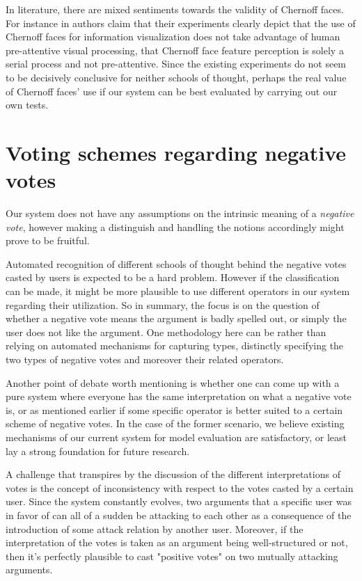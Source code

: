\documentclass{article}
\begin{document}
In literature, there are mixed sentiments towards the validity of Chernoff faces. For instance in \cite{Morris00} authors claim that their experiments clearly depict that the use of Chernoff faces for information visualization does not take advantage of human pre-attentive visual processing, that Chernoff face feature perception is solely a serial process and not pre-attentive. Since the existing experiments do not seem to be decisively conclusive for neither schools of thought, perhaps the real value of Chernoff faces' use if our system can be best evaluated by carrying out our own tests.


\section{Voting schemes regarding negative votes}
Our system does not have any assumptions on the intrinsic meaning of a \textit{negative vote}, however making a distinguish and handling the notions accordingly might prove to be fruitful.

Automated recognition of different schools of thought behind the negative votes casted by users is expected to be a hard problem. However if the classification can be made, it might be more plausible to use different operators in our system regarding their utilization. So in summary, the focus is on the question of whether a negative vote means the argument is badly spelled out, or simply the user does not like the argument. One methodology here can be rather than relying on automated mechanisms for capturing types, distinctly specifying the two types of negative votes and moreover their related operators. 

Another point of debate worth mentioning is whether one can come up with a pure system where everyone has the same interpretation on what a negative vote is, or as mentioned earlier if some specific operator is better suited to a certain scheme of negative votes. In the case of the former scenario, we believe existing mechanisms of our current system for model evaluation are satisfactory, or least lay a strong foundation for future research.

A challenge that transpires by the discussion of the different interpretations of votes is the concept of inconsistency with respect to the votes casted by a certain user. Since the system constantly evolves, two arguments that a specific user was in favor of can all of a sudden be attacking to each other as a consequence of the introduction of some attack relation by another user. Moreover, if the interpretation of the votes is taken as an argument being well-structured or not, then it's perfectly plausible to cast "positive votes" on two mutually attacking arguments.
\end{document}
